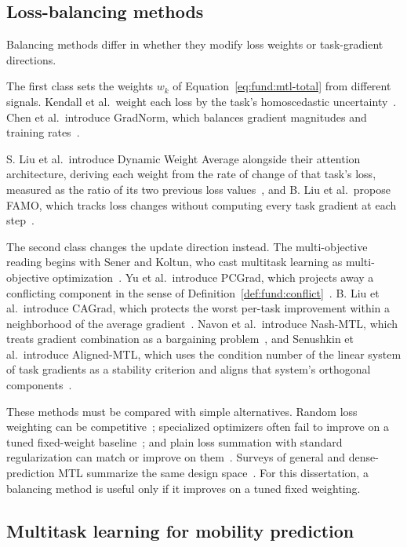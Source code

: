 \subsection{Loss-balancing methods}


Balancing methods differ in whether they modify loss weights or task-gradient
directions.

The first class sets the weights $w_k$ of Equation~\ref{eq:fund:mtl-total} from
different signals. Kendall et al.\ weight each loss by the task's homoscedastic
uncertainty~\cite{kendall2018uncertainty}. Chen et al.\ introduce GradNorm, which
balances gradient magnitudes and training rates~\cite{chen2018gradnorm}.

S. Liu et al.\ introduce Dynamic Weight Average alongside their attention
architecture, deriving each weight from the rate of change of that task's loss,
measured as the ratio of its two previous loss values~\cite{liu2019dwa}, and B. Liu et
al.\ propose FAMO, which tracks loss changes without computing every task gradient at
each step~\cite{liu2023famo}.

The second class changes the update direction instead. The multi-objective reading
begins with Sener and Koltun, who cast multitask learning as multi-objective
optimization~\cite{sener2018mgda}. Yu et al.\ introduce PCGrad, which projects away a
conflicting component in the sense of Definition~\ref{def:fund:conflict}~\cite{yu2020pcgrad}.
B. Liu et al.\ introduce CAGrad, which protects the worst per-task improvement within a
neighborhood of the average gradient~\cite{liu2021cagrad}. Navon et al.\ introduce
Nash-MTL, which treats gradient combination as a bargaining problem~\cite{nash}, and
Senushkin et al.\ introduce Aligned-MTL, which uses the condition number of the linear
system of task gradients as a stability criterion and aligns that system's orthogonal
components~\cite{senushkin2023aligned}.

These methods must be compared with
simple alternatives. Random loss weighting can be competitive~\cite{lin2022rlw};
specialized optimizers often fail to improve on a tuned fixed-weight
baseline~\cite{xin2022domtl}; and plain loss summation with standard regularization
can match or improve on them~\cite{kurin2022scalarization}. Surveys of general and
dense-prediction MTL summarize the same design
space~\cite{vandenhende2022mtl,yu2024survey}. For this dissertation, a balancing
method is useful only if it improves on a tuned fixed weighting.

\subsection{Multitask learning for mobility prediction}

